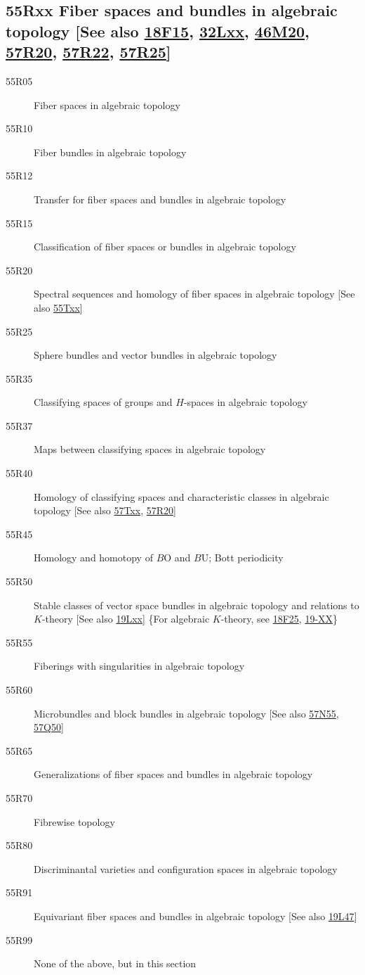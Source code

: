 \documentclass[letterpaper]{article}
\begin{document}
\subsection*{55Rxx  Fiber spaces and bundles in algebraic topology [See also \hyperref[18F15]{18F15}, \hyperref[32Lxx]{32Lxx}, \hyperref[46M20]{46M20}, \hyperref[57R20]{57R20}, \hyperref[57R22]{57R22}, \hyperref[57R25]{57R25}] }\label{55Rxx}
\begin{description}  
\item [55R05]\label{55R05} Fiber spaces in algebraic topology
\item [55R10]\label{55R10} Fiber bundles in algebraic topology
\item [55R12]\label{55R12} Transfer for fiber spaces and bundles in algebraic topology
\item [55R15]\label{55R15} Classification of fiber spaces or bundles in algebraic topology
\item [55R20]\label{55R20} Spectral sequences and homology of fiber spaces in algebraic topology [See also \hyperref[55Txx]{55Txx}]
\item [55R25]\label{55R25} Sphere bundles and vector bundles in algebraic topology
\item [55R35]\label{55R35} Classifying spaces of groups and $H$-spaces in algebraic topology
\item [55R37]\label{55R37} Maps between classifying spaces in algebraic topology
\item [55R40]\label{55R40} Homology of classifying spaces and characteristic classes in algebraic topology [See also \hyperref[57Txx]{57Txx}, \hyperref[57R20]{57R20}]
\item [55R45]\label{55R45} Homology and homotopy of $B\mathrm{O}$ and $B\mathrm{U}$; Bott periodicity
\item [55R50]\label{55R50} Stable classes of vector space bundles in algebraic topology and relations to $K$-theory [See also \hyperref[19Lxx]{19Lxx}] \{For algebraic $K$-theory, see \hyperref[18F25]{18F25}, \hyperref[19-XX]{19-XX}\}
\item [55R55]\label{55R55} Fiberings with singularities in algebraic topology
\item [55R60]\label{55R60} Microbundles and block bundles in algebraic topology [See also \hyperref[57N55]{57N55}, \hyperref[57Q50]{57Q50}]
\item [55R65]\label{55R65} Generalizations of fiber spaces and bundles in algebraic topology
\item [55R70]\label{55R70} Fibrewise topology
\item [55R80]\label{55R80} Discriminantal varieties and configuration spaces in algebraic topology
\item [55R91]\label{55R91} Equivariant fiber spaces and bundles in algebraic topology [See also \hyperref[19L47]{19L47}]
\item [55R99]\label{55R99} None of the above, but in this section
\end{description}
\end{document}
